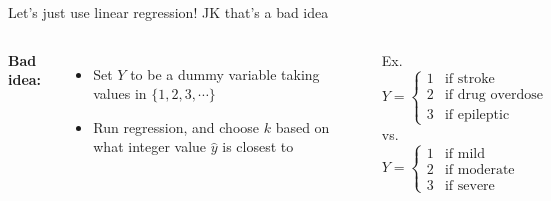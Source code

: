 \documentclass[aspectratio=169,usenames,dvipsnames]{beamer}
\newcommand{\InstructorNotes}[1]{\textit{\color{orange}#1}}
\renewcommand{\InstructorNotes}[1]{}
\begin{document}
	\begin{frame}[t]{Let's just use linear regression!}
		{JK that's a bad idea}
	
	\begin{columns}
	\centering
	\textbf{Bad idea:}
	\begin{itemize}
		\item Set $Y$ to be a dummy variable taking values in $\{1,2,3,\cdots\}$
		\item Run regression, and choose $k$ based on what integer value $\hat y$ is closest to
	\end{itemize}
	
	Ex.
	\begin{equation*}
		Y =
		\begin{cases}
			1 & \text{if stroke }\\
			2 & \text{if drug overdose }\\
			3 & \text{if epileptic seizure}
		\end{cases}
	\end{equation*}
	vs.
	\begin{equation*}
		Y =
		\begin{cases}
			1 & \text{if mild }\\
			2 & \text{if moderate }\\
			3 & \text{if severe}
		\end{cases}
	\end{equation*}
	\end{columns}
	\InstructorNotes{Ordering implies something about closeness, i.e., there has to be a monotonic relation between catergories. \\Draw a number line to emphasize this distinction. }
	\end{frame}
\end{document}
